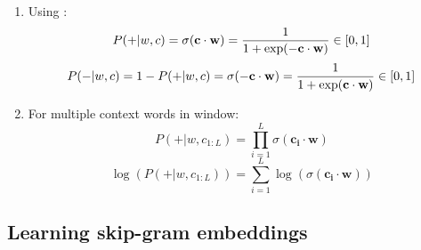 \begin{enumerate}
    \item Using :
    \[
        \displaystyle P(+|w, c) = \sigma(\mathbf{c\cdot w}) = \frac{1}{1 + \exp(-\mathbf{c\cdot w})} \hfill \in [0,1]
    \]
    \[
        P(-|w, c) = 1 - P(+|w, c) = \sigma(\mathbf{-c\cdot w}) = \frac{1}{1 + \exp(\mathbf{c\cdot w})} \hfill \in [0,1]
    \]

    \item For multiple context words in window:
    \[
        \displaystyle P(+|w, c_{1:L}) = \prod_{i=1}^{L} \sigma(\mathbf{c_i\cdot w})
    \]
    \[
        \displaystyle \log(P(+|w, c_{1:L})) = \sum_{i=1}^{L} \log(\sigma(\mathbf{c_i\cdot w}))
    \]

    
\end{enumerate}


\subsection{Learning skip-gram embeddings \cite{nlp-1}}
